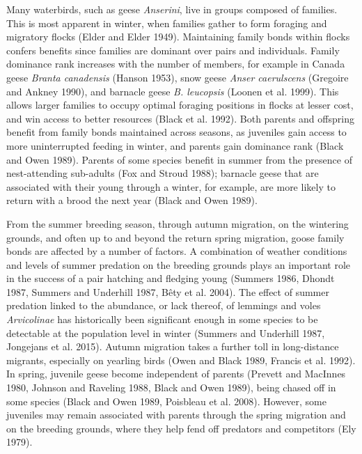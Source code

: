 \documentclass[10pt,twocolumn]{paper}
\begin{document}
Many waterbirds, such as geese \emph{Anserini}, live in groups composed
of families. This is most apparent in winter, when families gather to
form foraging and migratory flocks (Elder and Elder 1949). Maintaining
family bonds within flocks confers benefits since families are dominant
over pairs and individuals. Family dominance rank increases with the
number of members, for example in Canada geese \emph{Branta canadensis}
(Hanson 1953), snow geese \emph{Anser caerulscens} (Gregoire and Ankney
1990), and barnacle geese \emph{B. leucopsis} (Loonen et al. 1999). This
allows larger families to occupy optimal foraging positions in flocks at
lesser cost, and win access to better resources (Black et al. 1992).
Both parents and offspring benefit from family bonds maintained across
seasons, as juveniles gain access to more uninterrupted feeding in
winter, and parents gain dominance rank (Black and Owen 1989). Parents
of some species benefit in summer from the presence of nest-attending
sub-adults (Fox and Stroud 1988); barnacle geese that are associated
with their young through a winter, for example, are more likely to
return with a brood the next year (Black and Owen 1989).

From the summer breeding season, through autumn migration, on the
wintering grounds, and often up to and beyond the return spring
migration, goose family bonds are affected by a number of factors. A
combination of weather conditions and levels of summer predation on the
breeding grounds plays an important role in the success of a pair
hatching and fledging young (Summers 1986, Dhondt 1987, Summers and
Underhill 1987, Bêty et al. 2004). The effect of summer predation linked
to the abundance, or lack thereof, of lemmings and voles
\emph{Arvicolinae} has historically been significant enough in some
species to be detectable at the population level in winter (Summers and
Underhill 1987, Jongejans et al. 2015). Autumn migration takes a further
toll in long-distance migrants, especially on yearling birds (Owen and
Black 1989, Francis et al. 1992). In spring, juvenile geese become
independent of parents (Prevett and MacInnes 1980, Johnson and Raveling
1988, Black and Owen 1989), being chased off in some species (Black and
Owen 1989, Poisbleau et al. 2008). However, some juveniles may remain
associated with parents through the spring migration and on the breeding
grounds, where they help fend off predators and competitors (Ely 1979).
\end{document}
